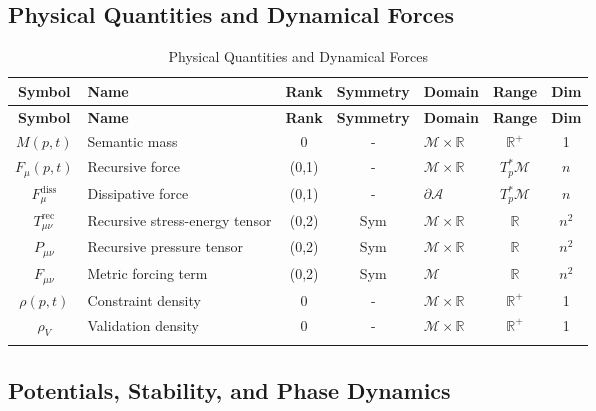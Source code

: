 \subsection{Physical Quantities and Dynamical Forces}
\label{2.2.4:physical_quantities_and_dynamical_forces}

{\small
\renewcommand{\arraystretch}{1.1}
\begin{longtable}{|c|p{5.5cm}|c|c|p{1.8cm}|c|c|}
\hline
\textbf{Symbol} & \textbf{Name} & \textbf{Rank} & \textbf{Symmetry} & \textbf{Domain} & \textbf{Range} & \textbf{Dim} \\
\hline
\endfirsthead
\hline
\textbf{Symbol} & \textbf{Name} & \textbf{Rank} & \textbf{Symmetry} & \textbf{Domain} & \textbf{Range} & \textbf{Dim} \\
\hline
\endhead
\(M(p,t)\) & Semantic mass & 0 & - & \(\mathcal{M} \times \mathbb{R}\) & \(\mathbb{R}^+\) & 1 \\
\hline
\(F_\mu(p,t)\) & Recursive force & (0,1) & - & \(\mathcal{M} \times \mathbb{R}\) & \(T_p^*\mathcal{M}\) & \(n\) \\
\hline
\(F_\mu^{\text{diss}}\) & Dissipative force & (0,1) & - & \(\partial\mathcal{A}\) & \(T_p^*\mathcal{M}\) & \(n\) \\
\hline
\(T_{\mu\nu}^{\text{rec}}\) & Recursive stress-energy tensor & (0,2) & Sym & \(\mathcal{M} \times \mathbb{R}\) & \(\mathbb{R}\) & \(n^2\) \\
\hline
\(P_{\mu\nu}\) & Recursive pressure tensor & (0,2) & Sym & \(\mathcal{M} \times \mathbb{R}\) & \(\mathbb{R}\) & \(n^2\) \\
\hline
\(F_{\mu\nu}\) & Metric forcing term & (0,2) & Sym & \(\mathcal{M}\) & \(\mathbb{R}\) & \(n^2\) \\
\hline
\(\rho(p,t)\) & Constraint density & 0 & - & \(\mathcal{M} \times \mathbb{R}\) & \(\mathbb{R}^+\) & 1 \\
\hline
\(\rho_V\) & Validation density & 0 & - & \(\mathcal{M} \times \mathbb{R}\) & \(\mathbb{R}^+\) & 1 \\
\hline
\caption{Physical Quantities and Dynamical Forces}
\end{longtable}
}


\subsection{Potentials, Stability, and Phase Dynamics}
\label{2.2.5:potentials_stability_and_phase_dynamics}

